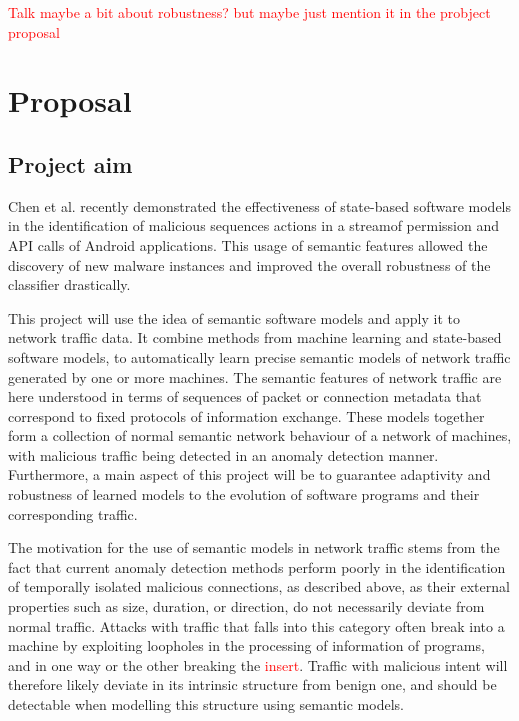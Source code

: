 \documentclass[a4paper,12pt,twoside]{report}
\begin{document}
\textcolor{red}{Talk maybe a bit about robustness? but maybe just mention it in the probject proposal}

\chapter{Proposal}

\section{Project aim}

Chen et al. \cite{chen_2016_robust,chen_more_2016} recently demonstrated the effectiveness of state-based software models in the identification of malicious sequences actions in a streamof permission and API calls of Android applications. This usage of semantic features allowed the discovery of new malware instances and improved the overall robustness of the classifier drastically. 

This project will use the idea of semantic software models and apply it to network traffic data. It combine methods from machine learning and state-based software models, to automatically learn precise semantic models of network traffic generated by one or more machines. The semantic features of network traffic are here understood in terms of sequences of packet or connection metadata that correspond to fixed protocols of information exchange. These models together form a collection of normal semantic network behaviour of a network of machines, with malicious traffic being detected in an anomaly detection manner. Furthermore, a main aspect of this project will be to guarantee adaptivity and robustness of learned models to the evolution of software programs and their corresponding traffic. 

The motivation for the use of semantic models in network traffic stems from the fact that current anomaly detection methods perform poorly in the identification of temporally isolated malicious connections, as described above, as their external properties such as size, duration, or direction, do not necessarily deviate from normal traffic. Attacks with traffic that falls into this category often break into a machine by exploiting loopholes in the processing of information of programs, and in one way or the other breaking the \textcolor{red}{insert}. Traffic with malicious intent will therefore likely deviate in its intrinsic structure from benign one, and should be detectable when modelling this structure using semantic models.
\end{document}

